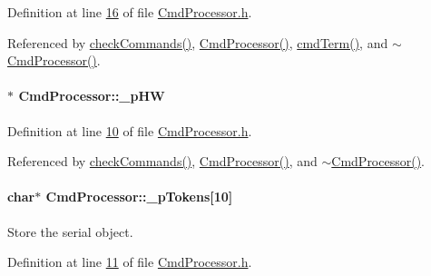 Definition at line \hyperlink{_cmd_processor_8h_source_l00016}{16} of file \hyperlink{_cmd_processor_8h_source}{CmdProcessor.h}.



Referenced by \hyperlink{_cmd_processor_8cpp_source_l00068}{checkCommands()}, \hyperlink{_cmd_processor_8cpp_source_l00011}{CmdProcessor()}, \hyperlink{_cmd_processor_8cpp_source_l00036}{cmdTerm()}, and \hyperlink{_cmd_processor_8cpp_source_l00025}{$\sim$CmdProcessor()}.

\hypertarget{class_cmd_processor_a8df6f12b27223c1f1876ea7221cd2413}{
\paragraph[{\_\-pHW}]{$\ast$ {\bf CmdProcessor::\_\-pHW}}\hfill}
\label{class_cmd_processor_a8df6f12b27223c1f1876ea7221cd2413}


Definition at line \hyperlink{_cmd_processor_8h_source_l00010}{10} of file \hyperlink{_cmd_processor_8h_source}{CmdProcessor.h}.



Referenced by \hyperlink{_cmd_processor_8cpp_source_l00068}{checkCommands()}, \hyperlink{_cmd_processor_8cpp_source_l00011}{CmdProcessor()}, and \hyperlink{_cmd_processor_8cpp_source_l00025}{$\sim$CmdProcessor()}.

\hypertarget{class_cmd_processor_a2b857367533cd33ba9a68746c71c5e3d}{
\paragraph[{\_\-pTokens}]{\setlength{\rightskip}{0pt plus 5cm}char$\ast$ {\bf CmdProcessor::\_\-pTokens}\mbox{[}10\mbox{]}}\hfill}
\label{class_cmd_processor_a2b857367533cd33ba9a68746c71c5e3d}


Store the serial object. 



Definition at line \hyperlink{_cmd_processor_8h_source_l00011}{11} of file \hyperlink{_cmd_processor_8h_source}{CmdProcessor.h}.



